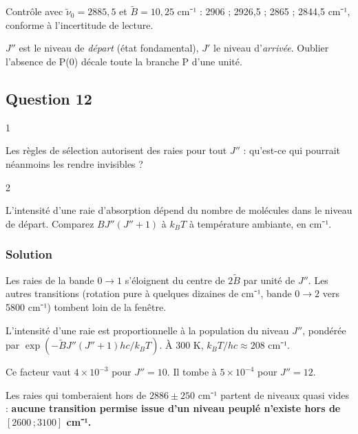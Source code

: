 \documentclass[11pt,a4paper]{article}
\begin{document}
Contrôle avec \(\tilde\nu_0=2885{,}5\) et \(\tilde B=10{,}25\) cm⁻¹ : 2906 ; 2926,5 ; 2865 ; 2844,5 cm⁻¹, conforme à l'incertitude de lecture.

\begin{piege}

\(J''\) est le niveau de \emph{départ} (état fondamental), \(J'\) le niveau d'\emph{arrivée}. Oublier l'absence de P(0) décale toute la branche P d'une unité.

\end{piege}

\hypertarget{question-12}{%
\subsection{Question 12}\label{question-12}}

\begin{indication}{1}

Les règles de sélection autorisent des raies pour tout \(J''\) : qu'est-ce qui pourrait néanmoins les rendre invisibles ?

\end{indication}

\begin{indication}{2}

L'intensité d'une raie d'absorption dépend du nombre de molécules dans le niveau de départ. Comparez \(BJ''(J''+1)\) à \(k_BT\) à température ambiante, en cm⁻¹.

\end{indication}

\hypertarget{solution-11}{%
\subsubsection{Solution}\label{solution-11}}

Les raies de la bande \(0\to1\) s'éloignent du centre de \(2\tilde B\) par unité de \(J''\). Les autres transitions (rotation pure à quelques dizaines de cm⁻¹, bande \(0\to2\) vers 5800 cm⁻¹) tombent loin de la fenêtre.

L'intensité d'une raie est proportionnelle à la population du niveau \(J''\), pondérée par \(\exp\left(-\tilde BJ''(J''+1)hc/k_BT\right)\). À 300 K, \(k_BT/hc\approx208\) cm⁻¹.

Ce facteur vaut \(4\times10^{-3}\) pour \(J''=10\). Il tombe à \(5\times10^{-4}\) pour \(J''=12\).

Les raies qui tomberaient hors de \(2886\pm250\) cm⁻¹ partent de niveaux quasi vides : \textbf{aucune transition permise issue d'un niveau peuplé n'existe hors de \([2600\,;3100]\) cm⁻¹.}
\end{document}
